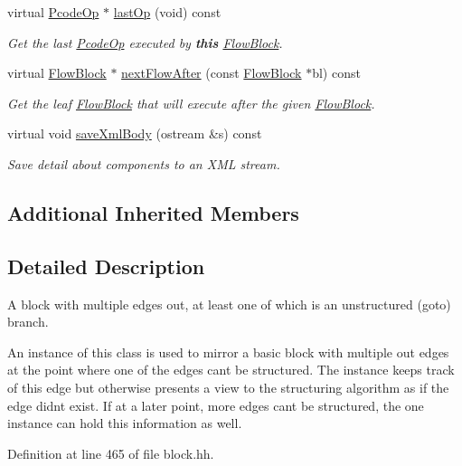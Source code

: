 \begin{DoxyCompactItemize}
virtual \mbox{\hyperlink{class_pcode_op}{Pcode\+Op}} $\ast$ \mbox{\hyperlink{class_block_multi_goto_a70cc69b1b4835ae574cebbbf13b868bd}{last\+Op}} (void) const
\begin{DoxyCompactList}\small\item\em Get the last \mbox{\hyperlink{class_pcode_op}{Pcode\+Op}} executed by {\bfseries{this}} \mbox{\hyperlink{class_flow_block}{Flow\+Block}}. \end{DoxyCompactList}\item 
virtual \mbox{\hyperlink{class_flow_block}{Flow\+Block}} $\ast$ \mbox{\hyperlink{class_block_multi_goto_a44d0021262e569ac4ecf6ecddbdf1d41}{next\+Flow\+After}} (const \mbox{\hyperlink{class_flow_block}{Flow\+Block}} $\ast$bl) const
\begin{DoxyCompactList}\small\item\em Get the leaf \mbox{\hyperlink{class_flow_block}{Flow\+Block}} that will execute after the given \mbox{\hyperlink{class_flow_block}{Flow\+Block}}. \end{DoxyCompactList}\item 
virtual void \mbox{\hyperlink{class_block_multi_goto_ac537bd161b597061aeca88bcc01e260c}{save\+Xml\+Body}} (ostream \&s) const
\begin{DoxyCompactList}\small\item\em Save detail about components to an X\+ML stream. \end{DoxyCompactList}\end{DoxyCompactItemize}
\subsection*{Additional Inherited Members}


\subsection{Detailed Description}
A block with multiple edges out, at least one of which is an unstructured (goto) branch. 

An instance of this class is used to mirror a basic block with multiple out edges at the point where one of the edges can\textquotesingle{}t be structured. The instance keeps track of this edge but otherwise presents a view to the structuring algorithm as if the edge didn\textquotesingle{}t exist. If at a later point, more edges can\textquotesingle{}t be structured, the one instance can hold this information as well. 

Definition at line 465 of file block.\+hh.



